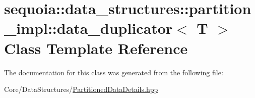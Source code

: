 \hypertarget{classsequoia_1_1data__structures_1_1partition__impl_1_1data__duplicator}{}\section{sequoia\+::data\+\_\+structures\+::partition\+\_\+impl\+::data\+\_\+duplicator$<$ T $>$ Class Template Reference}
\label{classsequoia_1_1data__structures_1_1partition__impl_1_1data__duplicator}


The documentation for this class was generated from the following file\+:\begin{DoxyCompactItemize}
\item 
Core/\+Data\+Structures/\mbox{\hyperlink{_partitioned_data_details_8hpp}{Partitioned\+Data\+Details.\+hpp}}\end{DoxyCompactItemize}
